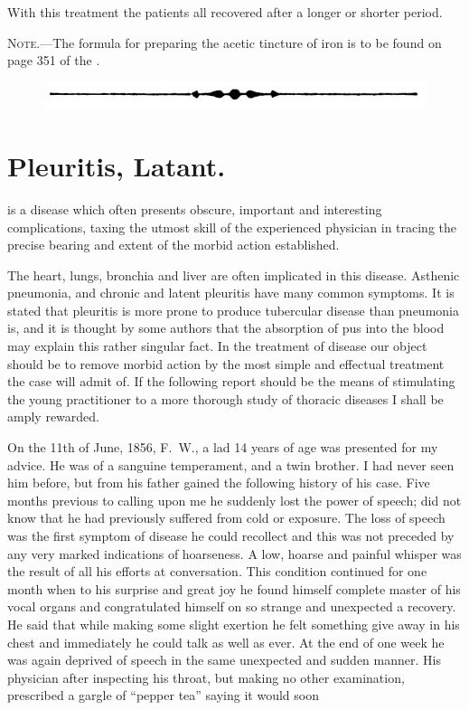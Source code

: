 
With this treatment the patients all recovered after a longer or shorter
period.

\textsc{Note.---}The formula for preparing the acetic tincture of iron is to be
found on page 351 of the .

\begin{figure}[H]
  \centering
  \includegraphics{pages/illustrations/arrow_bullet_divider.jpg}
\end{figure}

\section*{Pleuritis, Latant.}


 is a disease which often presents obscure, important and interesting
complications, taxing the utmost skill of the experienced physician
in tracing the precise bearing and extent of the morbid action
established.

The heart, lungs, bronchia and liver are often implicated in this disease.
Asthenic pneumonia, and chronic and latent pleuritis have many common
symptoms. It is stated that pleuritis is more prone to produce
tubercular disease than pneumonia is, and it is thought by some authors
that the absorption of pus into the blood may explain this rather singular
fact. In the treatment of disease our object should be to remove
morbid action by the most simple and effectual treatment the case will
admit of. If the following report should be the means of stimulating
the young practitioner to a more thorough study of thoracic diseases I
shall be amply rewarded.

On the 11th of June, 1856, F.~W., a lad 14 years of age was presented
for my advice. He was of a sanguine temperament, and a twin brother.
I had never seen him before, but from his father gained the following
history of his case. Five months previous to calling upon me he suddenly
lost the power of speech; did not know that he had previously
suffered from cold or exposure. The loss of speech was the first symptom
of disease he could recollect and this was not preceded by any
very marked indications of hoarseness. A low, hoarse and painful
whisper was the result of all his efforts at conversation. This condition
continued for one month when to his surprise and great joy he found
himself complete master of his vocal organs and congratulated himself
on so strange and unexpected a recovery. He said that while making
some slight exertion he felt something give away in his chest and immediately
he could talk as well as ever. At the end of one week he
was again deprived of speech in the same unexpected and sudden manner.
His physician after inspecting his throat, but making no other
examination, prescribed a gargle of ``pepper tea'' saying it would soon\endinput
